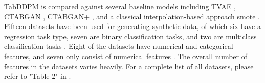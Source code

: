 TabDDPM is compared against several baseline \glspl{model} including TVAE \cite{xu2019ModelingTabularData}, CTABGAN \cite{zhao2021CTABGANEffectiveTablea}, CTABGAN+ \cite{zhao2022CTABGANEnhancingTabular},
and a classical interpolation-based approach \gls{smote} \cite{chawla2002SMOTESyntheticMinority}.
Fifteen datasets have been used for generating synthetic data, of which six have a regression task type, seven are binary classification tasks, and two are multiclass classification tasks \cite{kotelnikov2022TabDDPMModellingTabular}.
Eight of the datasets have numerical and categorical features, and seven only consist of numerical features \cite{kotelnikov2022TabDDPMModellingTabular}.
The overall number of features in the datasets varies heavily. 
For a complete list of all datasets, please refer to "Table 2" in \cite[p. 5]{kotelnikov2022TabDDPMModellingTabular}.

